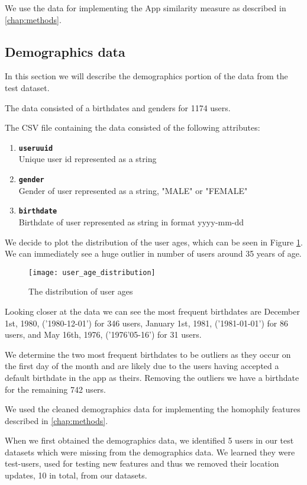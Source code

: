 We use the data for implementing the App similarity measure as described in \autoref{chap:methods}.

\subsection{Demographics data}
In this section we will describe the demographics portion of the data from the test dataset.

The data consisted of a birthdates and genders for 1174 users.

The CSV file containing the data consisted of the following attributes:
\begin{enumerate}
\item \texttt{\textbf{useruuid}}\\Unique user id represented as a string
\item \texttt{\textbf{gender}}\\Gender of user represented as a string, "MALE" or "FEMALE"
\item \texttt{\textbf{birthdate}}\\Birthdate of user represented as string in format yyyy-mm-dd
\end{enumerate}
We decide to plot the distribution of the user ages, which can be seen in Figure \ref{fig:user_age_distribution}. We can immediately see a huge outlier in number of users around 35 years of age.

\begin{figure}[H]
    \hspace*{-1.5cm}
    \centering
    \texttt{[image: user\_age\_distribution]}
    \caption{The distribution of user ages}
    \label{fig:user_age_distribution}
\end{figure}
Looking closer at the data we can see the most frequent birthdates are December 1st, 1980, ('1980-12-01') for 346 users, January 1st, 1981, ('1981-01-01') for 86 users, and May 16th, 1976, ('1976'05-16') for 31 users.

We determine the two most frequent birthdates to be outliers as they occur on the first day of the month and are likely due to the users having accepted a default birthdate in the app as theirs. Removing the outliers we have a birthdate for the remaining 742 users.

We used the cleaned demographics data for implementing the homophily features described in \autoref{chap:methods}.

When we first obtained the demographics data, we identified 5 users in our test datasets which were missing from the demographics data. 
We learned they were test-users, used for testing new features and thus we removed their location updates, 10 in total, from our datasets.


